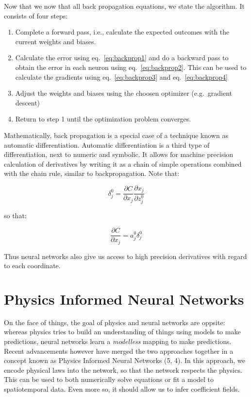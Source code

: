 \documentclass[12pt,a4paper,]{harvard-thesis}
\providecommand{\tightlist}{%
  \setlength{\itemsep}{0pt}\setlength{\parskip}{0pt}}
\begin{document}
Now that we now that all back propagation equations, we state the
algorithm. It consists of four steps:

\begin{enumerate}
\def\labelenumi{\arabic{enumi}.}
\tightlist
\item
  Complete a forward pass, i.e., calculate the expected outcomes with
  the current weights and biases.
\item
  Calculate the error using eq.~\ref{eq:backprop1} and do a backward
  pass to obtain the error in each neuron using eq.~\ref{eq:backprop2}.
  This can be used to calculate the gradients using
  eq.~\ref{eq:backprop3} and eq.~\ref{eq:backprop4}
\item
  Adjust the weights and biases using the choosen optimizer
  (e.g.~gradient descent)
\item
  Return to step 1 until the optimization problem converges.
\end{enumerate}

Mathematically, back propagation is a special case of a technique known
as automatic differentiation. Automatic differentiation is a third type
of differentiation, next to numeric and symbolic. It allows for machine
precision calculation of derivatives by writing it as a chain of simple
operations combined with the chain rule, similar to backpropagation.
Note that:

\[
\delta^0_j = \frac{\partial C}{\partial x_j}\frac{\partial x_j}{\partial z^0_j}
\]

so that:

\[
\frac{\partial C}{\partial x_j} = a^0_j \delta^0_j 
\]

Thus neural networks also give us access to high precision derivatives
with regard to each coordinate.

\hypertarget{physics-informed-neural-networks-1}{%
\section{Physics Informed Neural
Networks}\label{physics-informed-neural-networks-1}}

On the face of things, the goal of physics and neural networks are
oppsite: whereas physics tries to build an understanding of things using
models to make predictions, neural networks learn a \emph{modelless}
mapping to make predictions. Recent advancements however have merged the
two approaches together in a concept known as Physics Informed Neural
Networks (5, 4). In this approach, we encode physical laws into the
network, so that the network respects the physics. This can be used to
both numerically solve equations or fit a model to spatiotemporal data.
Even more so, it should allow us to infer coefficient fields.
\end{document}
